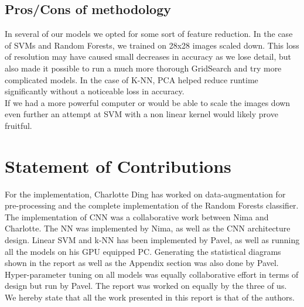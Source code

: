 \documentclass[twoside,twocolumn]{article}
\begin{document}
\subsection{Pros/Cons of methodology}
In several of our models we opted for some sort of feature reduction. In the case of SVMs and Random Forests, we trained on 28x28 images scaled down. This loss of resolution may have caused small decreases in accuracy as we lose detail, but also made it possible to run a much more thorough GridSearch and try more complicated models. In the case of K-NN, PCA helped reduce runtime significantly without a noticeable loss in accuracy. \\
If we had a more powerful computer or would be able to scale the images down even further an attempt at SVM with a non linear kernel would likely prove fruitful. 


\section{Statement of Contributions}
For the implementation, Charlotte Ding has worked on data-augmentation for pre-processing and the complete implementation of the Random Forests classifier. The implementation of CNN was a collaborative work between Nima and Charlotte. The NN was implemented by Nima, as well as the CNN architecture design. Linear SVM and k-NN has been implemented by Pavel, as well as running all the models on his GPU equipped PC. Generating the statistical diagrams shown in the report as well as the Appendix section was also done by Pavel. Hyper-parameter tuning on all models was equally collaborative effort in terms of design but run by Pavel. The report was worked on equally by the three of us. \\
We hereby state that all the work presented in this report is that of the authors.

\end{document}
